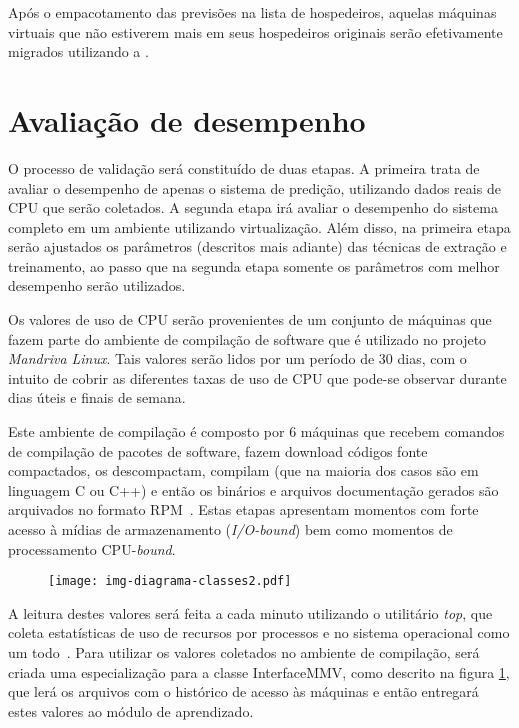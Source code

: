 Após o empacotamento das previsões na lista de hospedeiros, aquelas
máquinas virtuais que não estiverem mais em seus hospedeiros originais
serão efetivamente migrados utilizando a \libvirt{}.

\section{Avaliação de desempenho}\label{sec:desemp}


O processo de validação será constituído de duas etapas. A primeira trata de
avaliar o desempenho de apenas o sistema de predição, utilizando dados reais de
CPU que serão coletados. A segunda etapa irá avaliar o desempenho do sistema
completo em um ambiente utilizando virtualização. Além disso, na primeira etapa
serão ajustados os parâmetros (descritos mais adiante) das técnicas de extração
e treinamento, ao passo que na segunda etapa somente os parâmetros com melhor
desempenho serão utilizados.

Os valores de uso de CPU serão provenientes de um conjunto de máquinas que
fazem parte do ambiente de compilação de software que é utilizado no projeto
\emph{Mandriva Linux}. Tais valores serão lidos por um período de 30 dias, com
o intuito de cobrir as diferentes taxas de uso de CPU que pode-se observar
durante dias úteis e finais de semana.

Este ambiente de compilação é composto por $6$ máquinas que recebem
comandos de compilação de pacotes de software, fazem download códigos fonte
compactados, os descompactam, compilam (que na maioria dos casos são em
linguagem C ou C++) e então os binários e arquivos documentação gerados são
arquivados no formato RPM~\cite{ewing1996rpm}. Estas etapas apresentam
momentos com forte acesso à mídias de armazenamento (\emph{I/O-bound}) bem
como momentos de processamento CPU-\emph{bound}.

\begin{figure}[htp]
\centering
\texttt{[image: img-diagrama-classes2.pdf]}
\label{fig:diagramaclasses2}
\end{figure}

A leitura destes valores será feita a cada minuto utilizando o utilitário
\emph{top}, que coleta estatísticas de uso de recursos por processos e no
sistema operacional como um todo~\cite{andresen2004monitoring}. Para utilizar
os valores coletados no ambiente de compilação, será criada uma especialização
para a classe InterfaceMMV, como descrito na figura
\ref{fig:diagramaclasses2}, que lerá os arquivos com o histórico de acesso às
máquinas e então entregará estes valores ao módulo de aprendizado.

